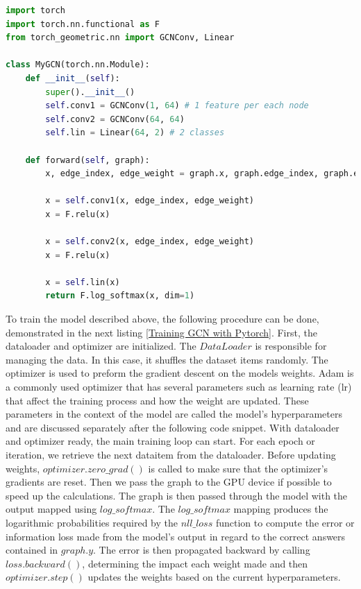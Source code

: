 \begin{lstlisting}[caption={Creating GCN with Pytorch}, label={Creating GCN with Pytorch}, language=Python]
import torch
import torch.nn.functional as F
from torch_geometric.nn import GCNConv, Linear

class MyGCN(torch.nn.Module):
    def __init__(self):
        super().__init__()
        self.conv1 = GCNConv(1, 64) # 1 feature per each node
        self.conv2 = GCNConv(64, 64)
        self.lin = Linear(64, 2) # 2 classes 

    def forward(self, graph):        
        x, edge_index, edge_weight = graph.x, graph.edge_index, graph.edge_weight
        
        x = self.conv1(x, edge_index, edge_weight)
        x = F.relu(x)
        
        x = self.conv2(x, edge_index, edge_weight)
        x = F.relu(x)
        
        x = self.lin(x)
        return F.log_softmax(x, dim=1)    
\end{lstlisting}

To train the model described above, the following procedure can be done, demonstrated in the next listing \ref{Training GCN with Pytorch}. First, the dataloader and optimizer are initialized. The $DataLoader$ is responsible for managing the data. In this case, it shuffles the dataset items randomly. The optimizer is used to preform the gradient descent on the models weights. Adam \cite{ADAMIC2003211} is a commonly used optimizer that has several parameters such as learning rate (lr) that affect the training process and how the weight are updated. These parameters in the context of the model are called the model's hyperparameters and are discussed separately after the following code snippet. With dataloader and optimizer ready, the main training loop can start. For each epoch or iteration, we retrieve the next dataitem from the dataloader. Before updating weights, $optimizer.zero\_grad()$ is called to make sure that the optimizer's gradients are reset. Then we pass the graph to the GPU device if possible to speed up the calculations. The graph is then passed through the model with the output mapped using $log\_softmax$. The $log\_softmax$ mapping produces the logarithmic probabilities required by the $nll\_loss$ function to compute the error or information loss made from the model's output in regard to the correct answers contained in $graph.y$. The error is then propagated backward by calling $loss.backward()$, determining the impact each weight made and then $optimizer.step()$ updates the weights based on the current hyperparameters.

